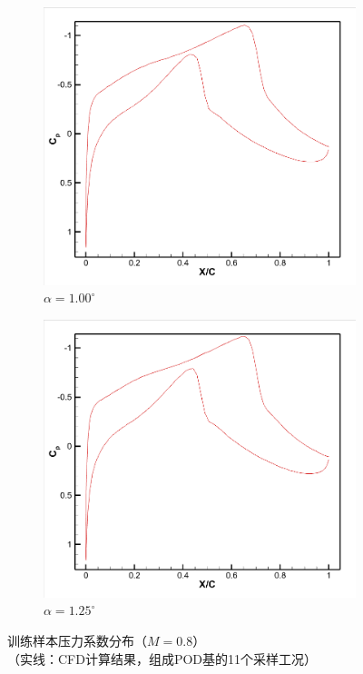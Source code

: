 \begin{figure}[H]
\hfill
\begin{subfigure}[b]{0.18\textwidth}
\centering
\includegraphics[width=\linewidth]{10.png}
\caption{$\alpha=1.00^\circ$}
\end{subfigure}

\vspace{0.5cm} %

\begin{subfigure}[b]{0.18\textwidth}
\centering
\includegraphics[width=\linewidth]{11.png}
\caption{$\alpha=1.25^\circ$}
\end{subfigure}

\caption{\songti 训练样本压力系数分布（$M=0.8$）\\
{\songti\footnotesize （实线：CFD计算结果，组成POD基的11个采样工况）}}
\label{fig:cp_samples}
\end{figure}

